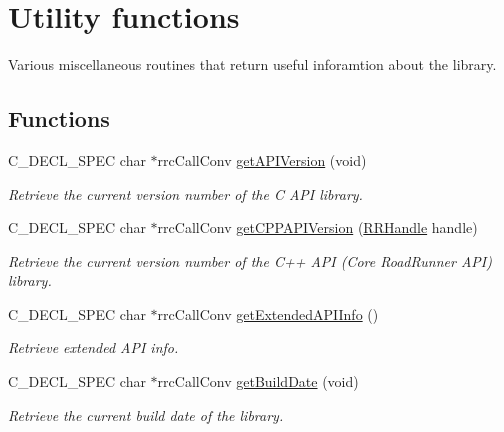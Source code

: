 \hypertarget{group__utility}{\section{Utility functions}
\label{group__utility}
}


Various miscellaneous routines that return useful inforamtion about the library.  


\subsection*{Functions}
\begin{DoxyCompactItemize}
\item 
C\-\_\-\-D\-E\-C\-L\-\_\-\-S\-P\-E\-C char $\ast$rrc\-Call\-Conv \hyperlink{group__utility_gaff2a26066f24b54f39c68beeb5338c3c}{get\-A\-P\-I\-Version} (void)
\begin{DoxyCompactList}\small\item\em Retrieve the current version number of the C A\-P\-I library. \end{DoxyCompactList}\item 
C\-\_\-\-D\-E\-C\-L\-\_\-\-S\-P\-E\-C char $\ast$rrc\-Call\-Conv \hyperlink{group__utility_ga090ca781c38ddbb220cfad882b172f53}{get\-C\-P\-P\-A\-P\-I\-Version} (\hyperlink{rrc__types_8h_a1d68f0592372208fa5a5f2799ea4b3ae}{R\-R\-Handle} handle)
\begin{DoxyCompactList}\small\item\em Retrieve the current version number of the C++ A\-P\-I (Core Road\-Runner A\-P\-I) library. \end{DoxyCompactList}\item 
C\-\_\-\-D\-E\-C\-L\-\_\-\-S\-P\-E\-C char $\ast$rrc\-Call\-Conv \hyperlink{group__utility_ga61250a85fdc6cc67f331bc4030bfeeed}{get\-Extended\-A\-P\-I\-Info} ()
\begin{DoxyCompactList}\small\item\em Retrieve extended A\-P\-I info. \end{DoxyCompactList}\item 
C\-\_\-\-D\-E\-C\-L\-\_\-\-S\-P\-E\-C char $\ast$rrc\-Call\-Conv \hyperlink{group__utility_gacf6956b3e7546fce03a36d3e52301358}{get\-Build\-Date} (void)
\begin{DoxyCompactList}\small\item\em Retrieve the current build date of the library. \end{DoxyCompactList}\item 

\end{DoxyCompactItemize}
